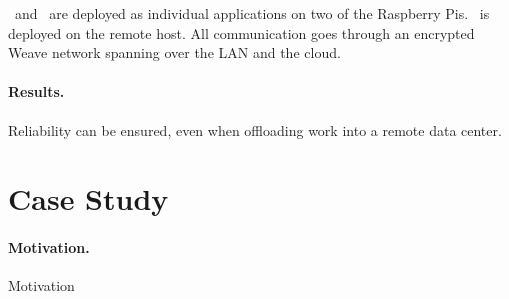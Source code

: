 \proda\ and \cons\ are deployed as individual applications on two of the Raspberry Pis. \prodb\ is deployed on the remote host. All communication goes through an encrypted Weave network spanning over the LAN and the cloud.



\paragraph{Results.} Reliability can be ensured, even when offloading work into a remote data center.

%
%
%
%
%
%
%
%
%
%

\section{Case Study}

\paragraph{Motivation.} Motivation

%
%
%
%
%
%
%
%
%
%


